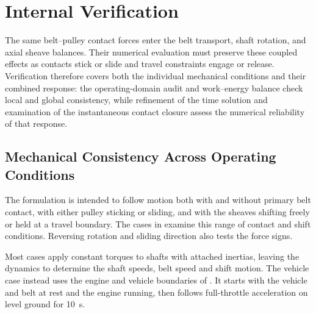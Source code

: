 \documentclass[11pt]{report}
\numberwithin{equation}{section}
\begin{document}
\section{Internal Verification}
\label{sec:results_verification}

The same belt--pulley contact forces enter the belt transport, shaft rotation,
and axial sheave balances. Their numerical evaluation must preserve these
coupled effects as contacts stick or slide and travel constraints engage or
release. Verification therefore covers both the individual mechanical
conditions and their combined response: the operating-domain audit and
work--energy balance check local and global consistency, while refinement of
the time solution and examination of the instantaneous contact closure assess
the numerical reliability of that response.

\subsection{Mechanical Consistency Across Operating Conditions}
\label{sec:results_mechanical_invariants}

The formulation is intended to follow motion both with and without primary 
belt contact, with either pulley sticking or sliding, and with the sheaves 
shifting freely or held at a travel boundary. The cases in 
 examine this range of contact 
and shift conditions. Reversing rotation and sliding direction also tests 
the force signs.

Most cases apply constant torques to shafts with attached inertias, leaving
the dynamics to determine the shaft speeds, belt speed and shift motion. The
vehicle case instead uses the engine and vehicle boundaries of
. It starts with the vehicle and belt at
rest and the engine running, then follows full-throttle acceleration on
level ground for \SI{10}{s}.
\end{document}

